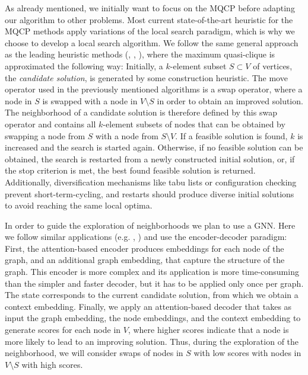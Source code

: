 \documentclass [11pt]{article}
\begin{document}
As already mentioned, we initially want to focus on the MQCP before adapting our algorithm to other problems. Most current state-of-the-art heuristic for the MQCP methods apply variations of the local search paradigm, which is why we choose to develop a local search algorithm. We follow the same general approach as the leading heuristic methods (\cite{djeddi_extension_2019}, \cite{zhou_opposition-based_2020}, \cite{chen_nuqclq_2021}), where the maximum quasi-clique is approximated the following way: Initially, a $k$-element subset $S \subset V$ of vertices, the \textit{candidate solution}, is generated by some construction heuristic. The move operator used in the previously mentioned algorithms is a swap operator, where a node in $S$ is swapped with a node in $V \setminus S$ in order to obtain an improved solution. The neighborhood of a candidate solution is therefore defined by this swap operator and contains all $k$-element subsets of nodes that can be obtained by swapping a node from $S$ with a node from $S \setminus V$. If a feasible solution is found, $k$ is increased and the search is started again. Otherwise, if no feasible solution can be obtained, the search is restarted from a newly constructed initial solution, or, if the stop criterion is met, the best found feasible solution is returned. Additionally, diversification mechanisms like tabu lists or configuration checking prevent short-term-cycling, and restarts should produce diverse initial solutions to avoid reaching the same local optima.  

In order to guide the exploration of neighborhoods we plan to use a GNN. Here we follow similar applications (e.g. \cite{Kool2019}, \cite{Hudson2021}) and use the encoder-decoder paradigm: First, the attention-based encoder produces embeddings for each node of the graph, and an additional graph embedding, that capture the structure of the graph. This encoder is more complex and its application is more time-consuming than the simpler and faster decoder, but it has to be applied only once per graph. The state corresponds to the current candidate solution, from which we obtain a context embedding. Finally, we apply an attention-based decoder that takes as input the graph embedding, the node embeddings, and the context embedding to generate scores for each node in $V$, where higher scores indicate that a node is more likely to lead to an improving solution. Thus, during the exploration of the neighborhood, we will consider swaps of nodes in $S$ with low scores with nodes in $V \setminus S$ with high scores. 
\end{document}
